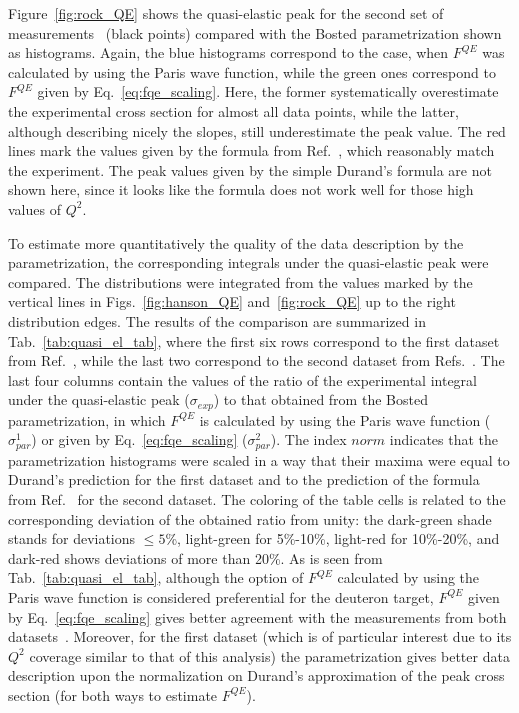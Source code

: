 Figure~\ref{fig:rock_QE} shows the quasi-elastic peak for the second set of measurements~\cite{Rock:1991jy,Rock_SLAC} (black points) compared with the Bosted parametrization shown as histograms. Again, the blue histograms correspond to the case, when $F^{QE}$ was calculated by using the Paris wave function, while the green ones correspond to $F^{QE}$ given by Eq.~\eqref{eq:fqe_scaling}. Here, the former systematically overestimate the experimental cross section for almost all data points, while the latter, although describing nicely the slopes, still underestimate the peak value. The red lines mark the values given by the formula from Ref.~\cite{Kocevar:1967}, which reasonably match the experiment. The peak values given by the simple Durand's formula are not shown here, since it looks like the formula does not work well for those high values of $Q^{2}$.



To estimate more quantitatively the quality of the data description by the parametrization, the corresponding integrals under the quasi-elastic peak were compared. The distributions were integrated from the values marked by the vertical lines in Figs.~\ref{fig:hanson_QE} and~\ref{fig:rock_QE} up to the right distribution edges. The results of the comparison are summarized in Tab.~\ref{tab:quasi_el_tab}, where the first six rows correspond to the first dataset from Ref.~\cite{Hanson:1973vf}, while the last two correspond to the second dataset from  Refs.~\cite{Rock:1991jy,Rock_SLAC}. The last four columns contain the values of the ratio of the experimental integral under the quasi-elastic peak ($\sigma_{exp}$) to that obtained from the Bosted parametrization, in which $F^{QE}$ is calculated by using the Paris wave function ($\sigma_{par}^{1}$) or given by Eq.~\eqref{eq:fqe_scaling} ($\sigma_{par}^{2}$). The index $norm$ indicates that the parametrization histograms were scaled in a way that their maxima were equal to Durand's prediction for the first dataset and to the prediction of the formula from Ref.~\cite{Kocevar:1967} for the second dataset. The coloring of the table cells is related to the corresponding deviation of the obtained ratio from unity: the dark-green shade stands for deviations $\leq 5$\%, light-green for 5\%-10\%, light-red for 10\%-20\%, and dark-red shows deviations of more than 20\%. As is seen from Tab.~\ref{tab:quasi_el_tab}, although the option of $F^{QE}$ calculated by using the Paris wave function is considered preferential for the deuteron target, $F^{QE}$ given by Eq.~\eqref{eq:fqe_scaling} gives better agreement with the measurements from both datasets~\cite{Hanson:1973vf,Rock:1991jy,Rock_SLAC}. Moreover, for the first dataset (which is of particular interest due to its $Q^{2}$ coverage similar to that of this analysis) the parametrization gives better data description upon the normalization on Durand's approximation of the peak cross section (for both ways to estimate $F^{QE}$).  

